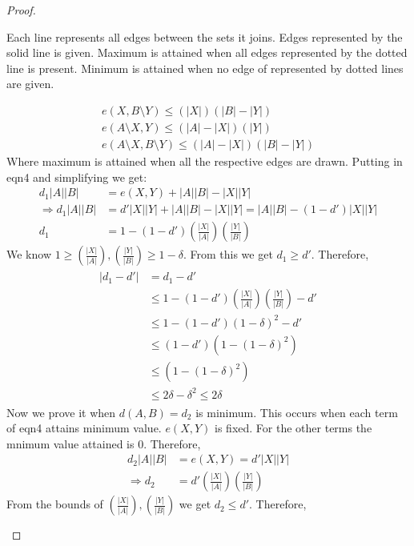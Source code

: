 \documentclass{tufte-handout}
\begin{document}
\begin{proof}
\begin{marginfigure}
\begin{tikzpicture}[x=0.75pt,y=0.75pt,yscale=-1,xscale=1]
	\end{tikzpicture}
	\caption{Each line represents all edges between the sets it joins. Edges represented by the solid line is given. Maximum is attained when all edges represented by the dotted line is present. Minimum is attained when no edge of represented by dotted lines are given.}
\end{marginfigure}
\begin{align}
	e(X,B\setminus Y)\leq (|X|)(|B|-|Y|)\\
	e(A\setminus X,Y)\leq(|A|-|X|)(|Y|)\\
	e(A\setminus X,B\setminus Y)\leq (|A|-|X|)(|B|-|Y|)
\end{align}
Where maximum is attained when all the respective edges are drawn.
Putting in eqn4 and simplifying we get:
\begin{align}
 d_1|A||B|&=e(X,Y)+|A||B|-|X||Y|\\
 \Rightarrow d_1|A||B|&=d'|X||Y|+|A||B|-|X||Y|=|A||B|-(1-d')|X||Y|\\
 d_1&=1-(1-d')\left(\frac{|X|}{|A|}\right)\left(\frac{|Y|}{|B|}\right)
\end{align}
We know $1\geq\left(\frac{|X|}{|A|}\right),\left(\frac{|Y|}{|B|}\right)\geq 1-\delta$. From this we get $d_1\geq d'$. Therefore,
\begin{align}
	\begin{split}
	|d_1-d'|&=d_1-d'\\
	&\leq 1-(1-d')\left(\frac{|X|}{|A|}\right)\left(\frac{|Y|}{|B|}\right)-d'\\
	&\leq 1-(1-d')(1-\delta)^2-d'\\
	&\leq (1-d')\left(1-(1-\delta)^2\right)\\
	&\leq \left(1-(1-\delta)^2\right)\\
	&\leq 2\delta-\delta^2\leq 2\delta
	\end{split}
\end{align}
Now we prove it when $d(A,B)=d_2$ is minimum. This occurs when each term of eqn4 attains minimum value. $e(X,Y)$ is fixed. For the other terms the mnimum value attained is 0. Therefore,
\begin{align}
	d_2|A||B|&=e(X,Y)=d'|X||Y|\\
\Rightarrow d_2&=d'\left(\frac{|X|}{|A|}\right)\left(\frac{|Y|}{|B|}\right)
\end{align}
From the bounds of $\left(\frac{|X|}{|A|}\right),\left(\frac{|Y|}{|B|}\right)$ we get $d_2\leq d'$. Therefore, 
\begin{align}
	\begin{split}

\end{split}
\end{align}
\end{proof}
\end{document}
